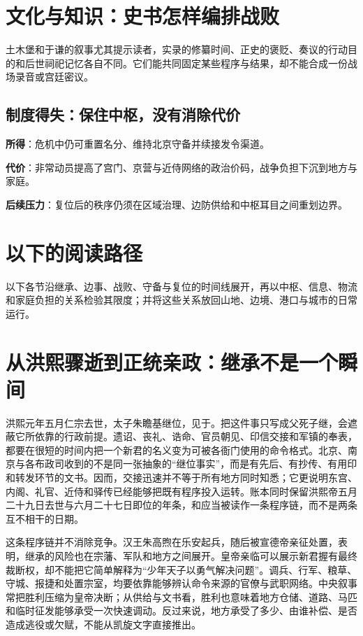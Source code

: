 \section{文化与知识：史书怎样编排战败}

土木堡和于谦的叙事尤其提示读者，实录的修纂时间、正史的褒贬、奏议的行动目的和后世祠祀记忆各自不同。它们能共同固定某些程序与结果，却不能合成一份战场录音或宫廷密议。

\subsection{制度得失：保住中枢，没有消除代价}
\textbf{所得}：危机中仍可重置名分、维持北京守备并续接发令渠道。

\textbf{代价}：非常动员提高了宫门、京营与近侍网络的政治价码，战争负担下沉到地方与家庭。

\textbf{后续压力}：复位后的秩序仍须在区域治理、边防供给和中枢耳目之间重划边界。

\section{以下的阅读路径}

以下各节沿继承、边事、战败、守备与复位的时间线展开，再以中枢、信息、物流和家庭负担的关系检验其限度；并将这些关系放回山地、边境、港口与城市的日常运行。

\section{从洪熙骤逝到正统亲政：继承不是一个瞬间}

洪熙元年五月仁宗去世，太子朱瞻基继位，见于。把这件事只写成父死子继，会遮蔽它所依靠的行政前提。遗诏、丧礼、诰命、官员朝见、印信交接和军镇的奉表，都要在很短的时间内把一个新君的名义变为可被各衙门使用的命令格式。北京、南京与各布政司收到的不是同一张抽象的“继位事实”，而是有先后、有抄传、有用印和转发环节的文书。因而，交接迅速并不等于所有地方同时知悉；它更说明东宫、内阁、礼官、近侍和驿传已经能够把既有程序投入运转。账本同时保留洪熙帝五月二十九日去世与六月二十七日即位的年条，和应当被读作一条程序链，而不是两条互不相干的日期。

这条程序链并不消除竞争。汉王朱高煦在乐安起兵，随后被宣德帝亲征处置，表明，继承的风险也在宗藩、军队和地方之间展开。皇帝亲临可以展示新君握有最终裁断权，却不能把它简单解释为“少年天子以勇气解决问题”。调兵、行军、粮草、守城、报捷和处置宗室，均要依靠能够辨认命令来源的官僚与武职网络。中央叙事常把胜利压缩为皇帝决断；从供给与文书看，胜利也意味着地方仓储、道路、马匹和临时征发能够承受一次快速调动。反过来说，地方承受了多少、由谁补偿、是否造成逃役或欠赋，不能从凯旋文字直接推出。

